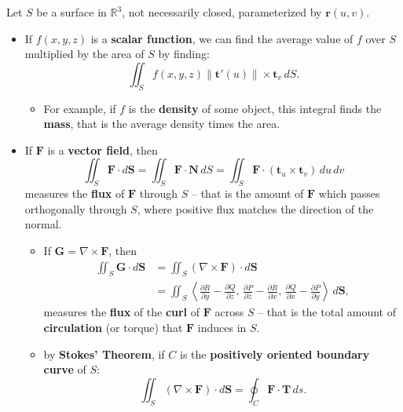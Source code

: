 \documentclass[10pt]{article}
\newcommand{\mb}[1]{\mathbf{#1}}
\newcommand{\vecfuc}[2]{\mb{#1}(#2)}
\newcommand{\normdvecfuc}[2]{\| \mb{#1}'(#2) \|}
\newcommand{\R}{\mathbb{R}}
\begin{document}
Let \(S\) be a surface in \(\R^{3}\), not necessarily closed, parameterized by \(\vecfuc{r}{u,v}\).
\begin{itemize}
    \item If \(f(x,y,z)\) is a \textcolor{horange!80}{\textbf{scalar function}}, we can find the average value of \(f\) over \(S\) multiplied by the area of \(S\) by finding:
    \[
        \iint_{S} f(x,y,z) \normdvecfuc{t}{u} \times \mb{t}_{v} \, dS.
    \]
    \begin{itemize}
        \item For example, if \(f\) is the \textcolor{horange!80}{\textbf{density}} of some object, this integral finds the \textcolor{horange!80}{\textbf{mass}}, that is the average density times the area.
    \end{itemize}
    \item If \(\mb{F}\) is a \textcolor{horange!80}{\textbf{vector field}}, then
    \[
        \iint_{S} \mb{F} \cdot d\mb{S} = \iint_{S} \mb{F} \cdot \mb{N} \, dS = \iint_{S} \mb{F} \cdot (\mb{t}_{u} \times \mb{t}_{v}) \, du \, dv
    \]
    measures the \textcolor{horange!80}{\textbf{flux}} of \(\mb{F}\) through \(S\) – that is the amount of \(\mb{F}\) which passes orthogonally through \(S\), where positive flux matches the direction of the normal.
    \begin{itemize}
        \item If \(\mb{G} = \nabla \times \mb{F}\), then 
        \begin{align*}
            \iint_{S} \mb{G} \cdot d\mb{S} &= \iint_{S} (\nabla \times \mb{F}) \cdot d\mb{S} \\
            &= \iint_{S} \left\langle \frac{\partial R}{\partial y} - \frac{\partial Q}{\partial z}, \, \frac{\partial P}{\partial z} - \frac{\partial R}{\partial x}, \, \frac{\partial Q}{\partial x} - \frac{\partial P}{\partial y} \right\rangle \, d\mb{S},
        \end{align*}
        measures the \textcolor{horange!80}{\textbf{flux}} of the \textcolor{horange!80}{\textbf{curl}} of \(\mb{F}\) across \(S\) – that is the total amount of \textcolor{horange!80}{\textbf{circulation}} (or torque) that \(\mb{F}\) induces in \(S\).
        \item by \textcolor{horange!80}{\textbf{Stokes’ Theorem}}, if \(C\) is the \textcolor{horange!80}{\textbf{positively oriented boundary curve}} of \(S\):
        \[
            \iint_{S} (\nabla \times \mb{F}) \cdot d\mb{S} = \oint_{C} \mb{F} \cdot \mb{T} \, ds.
        \]
    \end{itemize}

\end{itemize}
\end{document}
